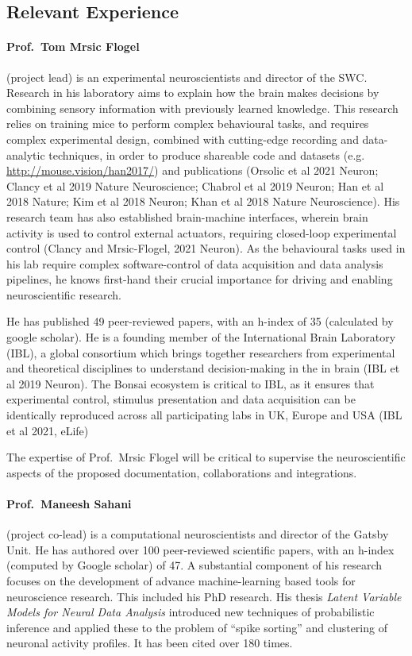 
\subsection*{Relevant Experience}

\paragraph{Prof.~Tom Mrsic Flogel} (project lead) is an experimental
neuroscientists and director of the SWC. Research in his laboratory aims to explain how the
brain makes decisions by combining sensory information with previously learned
knowledge. This research relies on training mice to perform complex behavioural
tasks, and requires complex experimental design, combined with cutting-edge
recording and data-analytic techniques, in order to produce shareable code and
datasets (e.g.
\href{http://mouse.vision/han2017/}{http://mouse.vision/han2017/}) and
publications (Orsolic et al 2021 Neuron; Clancy et al 2019 Nature Neuroscience;
Chabrol et al 2019 Neuron; Han et al 2018 Nature; Kim et al 2018 Neuron; Khan
et al 2018 Nature Neuroscience). His research team has also established brain-machine
interfaces, wherein brain activity is used to control external actuators,
requiring closed-loop experimental control (Clancy and Mrsic-Flogel, 2021
Neuron).  As the behavioural tasks used in his lab require complex
software-control of data acquisition and data analysis pipelines, he knows
first-hand their crucial importance for driving and enabling neuroscientific
research.

He has published 49 peer-reviewed papers, with an h-index of 35 (calculated by
google scholar).  He is a founding member of the International Brain
Laboratory (IBL), a global consortium which brings together researchers from
experimental and theoretical disciplines to understand decision-making in the
in brain (IBL et al 2019 Neuron). The Bonsai ecosystem is critical to IBL, as
it ensures that experimental control, stimulus presentation and data
acquisition can be identically reproduced across all participating labs in UK,
Europe and USA (IBL et al 2021, eLife)

The expertise of Prof.~Mrsic Flogel will be critical to supervise the
neuroscientific aspects of the proposed documentation, collaborations and
integrations.

\paragraph{Prof.~Maneesh Sahani} (project co-lead) is a computational
neuroscientists and director of the Gatsby Unit. He has authored over 100
peer-reviewed scientific papers, with an h-index (computed by Google scholar)
of 47. A substantial component of his research focuses on the development of
advance machine-learning based tools for neuroscience research. This included
his PhD research. His thesis \textit{Latent Variable Models for Neural Data
Analysis} introduced new techniques of probabilistic inference and applied
these to the problem of “spike sorting” and clustering of neuronal activity
profiles. It has been cited over 180 times.

